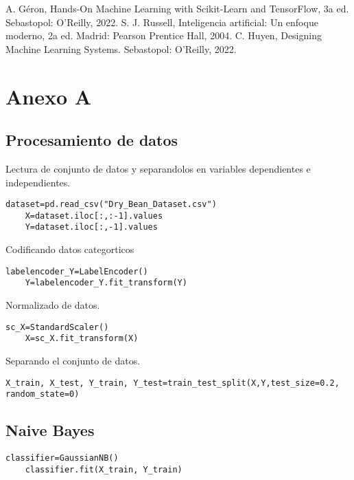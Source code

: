 \documentclass[conference]{IEEEtran}
\begin{document}
\begin{thebibliography}{00}
A. Géron, Hands-On Machine Learning with Scikit-Learn and TensorFlow, 3a ed. Sebastopol: O’Reilly, 2022.
 S. J. Russell, Inteligencia artificial: Un enfoque moderno, 2a ed. Madrid: Pearson Prentice Hall, 2004.
C. Huyen, Designing Machine Learning Systems. Sebastopol: O’Reilly, 2022.


\end{thebibliography}

\section{Anexo A}
\subsection{Procesamiento de datos}
Lectura de conjunto de datos y separandolos en variables dependientes e independientes.  
\lstset{language=Python, breaklines=true, basicstyle=\footnotesize}
\lstset{numbers=left, numberstyle=\tiny, stepnumber=1, numbersep=-2pt}
\begin{lstlisting}[frame=single]
    dataset=pd.read_csv("Dry_Bean_Dataset.csv")
    X=dataset.iloc[:,:-1].values
    Y=dataset.iloc[:,-1].values
\end{lstlisting}

Codificando datos categorticos
\begin{lstlisting}[frame=single]
    labelencoder_Y=LabelEncoder()
    Y=labelencoder_Y.fit_transform(Y)
\end{lstlisting}

Normalizado de datos. 
\begin{lstlisting}[frame=single]
    sc_X=StandardScaler()
    X=sc_X.fit_transform(X)
\end{lstlisting}

Separando el conjunto de datos.
\begin{lstlisting}[frame=single]
    X_train, X_test, Y_train, Y_test=train_test_split(X,Y,test_size=0.2, random_state=0)
\end{lstlisting}

\subsection{Naive Bayes}

\begin{lstlisting}[frame=single]
    classifier=GaussianNB()
    classifier.fit(X_train, Y_train)
\end{lstlisting}
\end{document}
